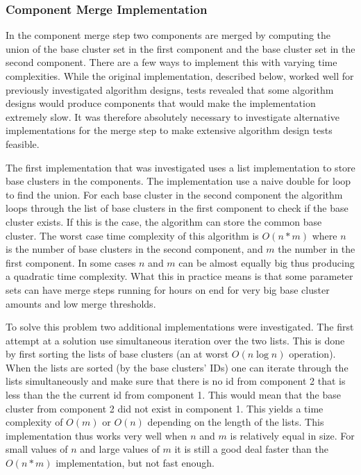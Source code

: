 \subsubsection{Component Merge Implementation}
\label{subsubsec:componentmerge}
In the component merge step two components are merged by computing the union of the base cluster set in the first component and the base cluster set in the second component. There are a few ways to implement this with varying time complexities. While the original implementation, described below, worked well for previously investigated algorithm designs, tests revealed that some algorithm designs would produce components that would make the implementation extremely slow. It was therefore absolutely necessary to investigate alternative implementations for the merge step to make extensive algorithm design tests feasible.

The first implementation that was investigated uses a list implementation to store base clusters in the components. The implementation use a naive double for loop to find the union. For each base cluster in the second component the algorithm loops through the list of base clusters in the first component to check if the base cluster exists. If this is the case, the algorithm can store the common base cluster. The worst case time complexity of this algorithm is \(O(n*m)\) where \(n\) is the number of base clusters in the second component, and \(m\) the number in the first component. In some cases \(n\) and \(m\) can be almost equally big thus producing a quadratic time complexity. What this in practice means is that some parameter sets can have merge steps running for hours on end for very big base cluster amounts and low merge thresholds.

To solve this problem two additional implementations were investigated. The first attempt at a solution use simultaneous iteration over the two lists. This is done by first sorting the lists of base clusters (an at worst \(O(n \log n)\) operation). When the lists are sorted (by the base clusters' IDs) one can iterate through the lists simultaneously and make sure that there is no id from component 2 that is less than the the current id from component 1. This would mean that the base cluster from component 2 did not exist in component 1. This yields a time complexity of \(O(m)\) or \(O(n)\) depending on the length of the lists. This implementation thus works very well when \(n\) and \(m\) is relatively equal in size. For small values of \(n\) and large values of \(m\) it is still a good deal faster than the \(O(n*m)\) implementation, but not fast enough.

